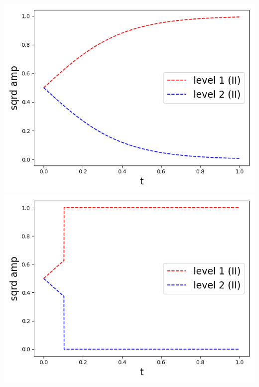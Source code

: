 \documentclass[11pt, oneside]{book}
\theoremstyle{break}
\theoremstyle{break}
\begin{document}
\begin{center}
\includegraphics[scale=0.39]{542HW2/II/4II_single.png}\qquad
\includegraphics[scale=0.39]{542HW2/II/5II_single.png}
\end{center}
\end{document}
